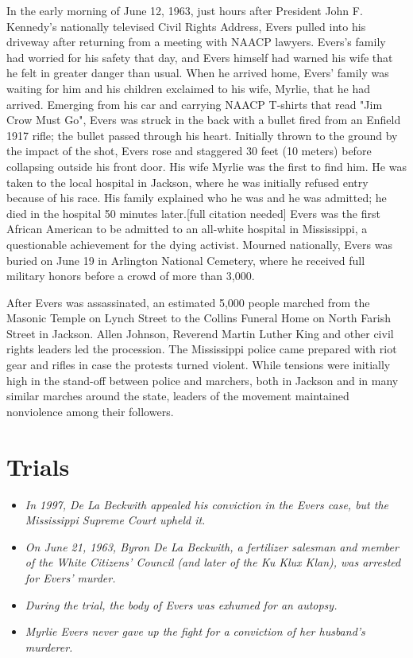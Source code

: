 In the early morning of June 12, 1963, just hours after President John
F. Kennedy's nationally televised Civil Rights Address, Evers pulled
into his driveway after returning from a meeting with NAACP lawyers.
Evers's family had worried for his safety that day, and Evers himself
had warned his wife that he felt in greater danger than usual. When he
arrived home, Evers' family was waiting for him and his children
exclaimed to his wife, Myrlie, that he had arrived. Emerging from his
car and carrying NAACP T-shirts that read "Jim Crow Must Go", Evers was
struck in the back with a bullet fired from an Enfield 1917 rifle; the
bullet passed through his heart. Initially thrown to the ground by the
impact of the shot, Evers rose and staggered 30 feet (10 meters) before
collapsing outside his front door. His wife Myrlie was the first to find
him. He was taken to the local hospital in Jackson, where he was
initially refused entry because of his race. His family explained who he
was and he was admitted; he died in the hospital 50 minutes
later.{[}full citation needed{]} Evers was the first African American to
be admitted to an all-white hospital in Mississippi, a questionable
achievement for the dying activist. Mourned nationally, Evers was buried
on June 19 in Arlington National Cemetery, where he received full
military honors before a crowd of more than 3,000.

After Evers was assassinated, an estimated 5,000 people marched from the
Masonic Temple on Lynch Street to the Collins Funeral Home on North
Farish Street in Jackson. Allen Johnson, Reverend Martin Luther King and
other civil rights leaders led the procession. The Mississippi police
came prepared with riot gear and rifles in case the protests turned
violent. While tensions were initially high in the stand-off between
police and marchers, both in Jackson and in many similar marches around
the state, leaders of the movement maintained nonviolence among their
followers.

\section{Trials}\label{trials}

\begin{itemize}
\item
  \emph{In 1997, De La Beckwith appealed his conviction in the Evers
  case, but the Mississippi Supreme Court upheld it.}
\item
  \emph{On June 21, 1963, Byron De La Beckwith, a fertilizer salesman
  and member of the White Citizens' Council (and later of the Ku Klux
  Klan), was arrested for Evers' murder.}
\item
  \emph{During the trial, the body of Evers was exhumed for an autopsy.}
\item
  \emph{Myrlie Evers never gave up the fight for a conviction of her
  husband's murderer.}
\end{itemize}

